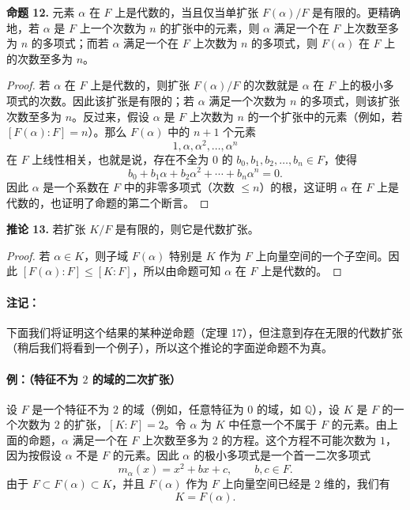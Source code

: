 \noindent\textbf{命题 12.} 元素 $\alpha$ 在 $F$ 上是代数的，当且仅当单扩张 $F(\alpha)/F$ 是有限的。更精确地，若 $\alpha$ 是 $F$ 上一个次数为 $n$ 的扩张中的元素，则 $\alpha$ 满足一个在 $F$ 上次数至多为 $n$ 的多项式；而若 $\alpha$ 满足一个在 $F$ 上次数为 $n$ 的多项式，则 $F(\alpha)$ 在 $F$ 上的次数至多为 $n$。

\begin{proof}
	若 $\alpha$ 在 $F$ 上是代数的，则扩张 $F(\alpha)/F$ 的次数就是 $\alpha$ 在 $F$ 上的极小多项式的次数。因此该扩张是有限的；若 $\alpha$ 满足一个次数为 $n$ 的多项式，则该扩张次数至多为 $n$。反过来，假设 $\alpha$ 是 $F$ 上次数为 $n$ 的一个扩张中的元素（例如，若 $[F(\alpha):F]=n$）。那么 $F(\alpha)$ 中的 $n+1$ 个元素
	\[
	1,\alpha,\alpha^2,
	\ldots,\alpha^n
	\]
	在 $F$ 上线性相关，也就是说，存在不全为 $0$ 的 $b_0,b_1,b_2,\ldots,b_n\in F$，使得
	\[
	b_0+b_1\alpha+b_2\alpha^2+\cdots+b_n\alpha^n=0.
	\]
	因此 $\alpha$ 是一个系数在 $F$ 中的非零多项式（次数 $\leq n$）的根，这证明 $\alpha$ 在 $F$ 上是代数的，也证明了命题的第二个断言。
\end{proof}

\noindent\textbf{推论 13.} 若扩张 $K/F$ 是有限的，则它是代数扩张。

\begin{proof}
	若 $\alpha\in K$，则子域 $F(\alpha)$ 特别是 $K$ 作为 $F$ 上向量空间的一个子空间。因此 $[F(\alpha):F]\leq [K:F]$，所以由命题可知 $\alpha$ 在 $F$ 上是代数的。
\end{proof}

\paragraph{注记：} 下面我们将证明这个结果的某种逆命题（定理 17），但注意到存在无限的代数扩张（稍后我们将看到一个例子），所以这个推论的字面逆命题不为真。

\paragraph{例：（特征不为 $2$ 的域的二次扩张）}
设 $F$ 是一个特征不为 $2$ 的域（例如，任意特征为 $0$ 的域，如 $\mathbb Q$），设 $K$ 是 $F$ 的一个次数为 $2$ 的扩张，$[K:F]=2$。令 $\alpha$ 为 $K$ 中任意一个不属于 $F$ 的元素。由上面的命题，$\alpha$ 满足一个在 $F$ 上次数至多为 $2$ 的方程。这个方程不可能次数为 $1$，因为按假设 $\alpha$ 不是 $F$ 的元素。因此 $\alpha$ 的极小多项式是一个首一二次多项式
\[
m_\alpha(x)=x^2+bx+c,\qquad b,c\in F.
\]
由于 $F\subset F(\alpha)\subset K$，并且 $F(\alpha)$ 作为 $F$ 上向量空间已经是 $2$ 维的，我们有
\[
K=F(\alpha).
\]


